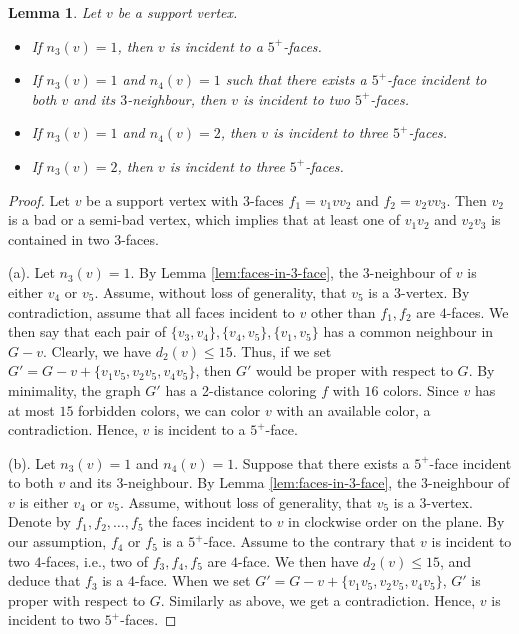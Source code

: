 \documentclass[12pt, reqno]{amsart}
\theoremstyle{plain}
\newtheorem{lemma}[equation]{Lemma}
\theoremstyle{definition}
\numberwithin{equation}{section}
\begin{document}
\begin{lemma}\label{lem:support-properties}
Let $v$ be a support vertex. 
\begin{itemize}
\item[$(a)$] If $n_3(v)=1$, then  $v$ is incident to a $5^+$-faces. 
\item[$(b)$] If $n_3(v)=1$ and $n_4(v)=1$ such that there exists a $5^+$-face incident to  both $v$ and its $3$-neighbour, then  $v$ is incident to two $5^+$-faces. 
\item[$(c)$] If $n_3(v)=1$ and $n_4(v)=2$, then  $v$ is incident to three $5^+$-faces. 
\item[$(d)$] If $n_3(v)=2$, then $v$ is incident to three $5^+$-faces. 
\end{itemize}
\end{lemma}
\begin{proof} 
Let $v$ be a support vertex with $3$-faces $f_1=v_1vv_2$ and $f_2=v_2vv_3$. Then $v_2$ is a bad or a semi-bad vertex, which implies that at least one of $v_1v_2$ and $v_2v_3$ is contained in two $3$-faces.

(a).  Let $n_3(v)=1$.  By Lemma \ref{lem:faces-in-3-face}, the $3$-neighbour of $v$ is either $v_4$ or $v_5$. Assume, without loss of generality,  that $v_5$ is a $3$-vertex. By contradiction, assume that all faces incident to $v$ other than $f_1,f_2$ are $4$-faces. We then say that each pair of $\{v_3,v_4\}, \{v_4,v_5\}, \{v_1,v_5\}$ has a common neighbour in $G-v$. Clearly, we have $d_2(v)\leq 15$. Thus, if we set $G'=G-v+\{v_1v_5,v_2v_5,v_4v_5\}$, then $G'$ would be proper with respect to $G$. By minimality, the graph $G'$ has a 2-distance coloring $f$ with $16$ colors. Since $v$ has at most $15$ forbidden colors, we can color $v$ with an available color, a contradiction. Hence, $v$ is incident to a $5^+$-face.

(b). Let $n_3(v)=1$ and $n_4(v)=1$. Suppose that there exists a $5^+$-face incident to  both $v$ and its $3$-neighbour.  By Lemma \ref{lem:faces-in-3-face}, the $3$-neighbour of $v$ is either $v_4$ or $v_5$. Assume, without loss of generality,  that $v_5$ is a $3$-vertex.   Denote by $f_1,f_2,\ldots,f_5$ the faces incident to $v$ in clockwise order on the plane. By our assumption, $f_4$ or $f_5$ is a $5^+$-face.
Assume to the contrary that $v$ is incident to two $4$-faces, i.e., two of $f_3,f_4,f_5$ are $4$-face. We then have $d_2(v)\leq 15$, and deduce that $f_3$ is a $4$-face.
When we set $G'=G-v+\{v_1v_5,v_2v_5,v_4v_5\}$, $G'$ is proper with respect to $G$. Similarly as above, we get a contradiction. Hence, $v$ is incident to two $5^+$-faces.



\end{proof}
\end{document}
